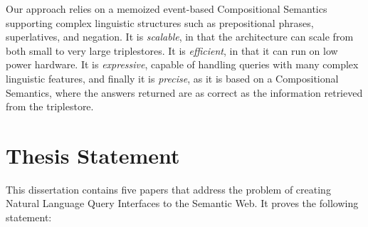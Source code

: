 \documentclass[../main.tex]{subfiles}
\begin{document}
\begin{refsection}
Our approach relies on a memoized event-based Compositional Semantics supporting complex linguistic structures such as prepositional phrases, superlatives, and negation.  It is \textit{scalable}, in that
the architecture can scale from both small to very large triplestores.  It is \textit{efficient}, in that
it can run on low power hardware.  It is \textit{expressive}, capable of handling queries with many complex linguistic features, and finally it is \textit{precise}, as it is based on a Compositional Semantics,
where the answers returned are as correct as the information retrieved from the triplestore.



%









\section{Thesis Statement}

This dissertation contains five papers that address the problem of creating Natural Language Query Interfaces to the Semantic Web.  It proves the following statement:


\end{refsection}
\end{document}
